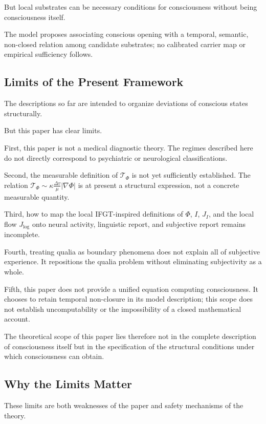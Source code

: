 But local substrates can be necessary conditions for consciousness without being consciousness itself.

The model proposes associating conscious opening with a temporal, semantic, non-closed relation among candidate substrates; no calibrated carrier map or empirical sufficiency follows.

\subsection{Limits of the Present Framework}


The descriptions so far are intended to organize deviations of conscious states structurally.

But this paper has clear limits.

First, this paper is not a medical diagnostic theory. The regimes described here do not directly correspond to psychiatric or neurological classifications.

Second, the measurable definition of $\mathcal{T}_{\Phi}$ is not yet sufficiently established. The relation $\mathcal{T}_{\Phi} \sim \kappa \frac{\Delta v}{\mu} |\nabla\Phi|$ is at present a structural expression, not a concrete measurable quantity.

Third, how to map the local IFGT-inspired definitions of $\Phi$, $I$, $J_I$, and the local flow $J_{\log}$ onto neural activity, linguistic report, and subjective report remains incomplete.

Fourth, treating qualia as boundary phenomena does not explain all of subjective experience. It repositions the qualia problem without eliminating subjectivity as a whole.

Fifth, this paper does not provide a unified equation computing consciousness. It chooses to retain temporal non-closure in its model description; this scope does not establish uncomputability or the impossibility of a closed mathematical account.

The theoretical scope of this paper lies therefore not in the complete description of consciousness itself but in the specification of the structural conditions under which consciousness can obtain.

\subsection{Why the Limits Matter}


These limits are both weaknesses of the paper and safety mechanisms of the theory.


